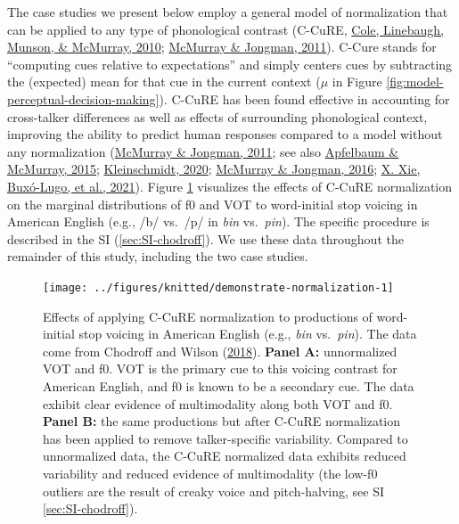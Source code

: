 \documentclass[
  11pt,
  man,floatsintext]{apa6}
\begin{document}
The case studies we present below employ a general model of normalization that can be applied to any type of phonological contrast (C-CuRE, \protect\hyperlink{ref-cole2010}{Cole, Linebaugh, Munson, \& McMurray, 2010}; \protect\hyperlink{ref-mcmurray-jongman2011}{McMurray \& Jongman, 2011}). C-Cure stands for ``computing cues relative to expectations'' and simply centers cues by subtracting the (expected) mean for that cue in the current context (\(\mu\) in Figure \ref{fig:model-perceptual-decision-making}). C-CuRE has been found effective in accounting for cross-talker differences as well as effects of surrounding phonological context, improving the ability to predict human responses compared to a model without any normalization (\protect\hyperlink{ref-mcmurray-jongman2011}{McMurray \& Jongman, 2011}; see also \protect\hyperlink{ref-apfelbaum-mcmurray2015}{Apfelbaum \& McMurray, 2015}; \protect\hyperlink{ref-kleinschmidt2020}{Kleinschmidt, 2020}; \protect\hyperlink{ref-mcmurray-jongman2016}{McMurray \& Jongman, 2016}; \protect\hyperlink{ref-xie2021cognition}{X. Xie, Buxó-Lugo, et al., 2021}).
Figure \ref{fig:demonstrate-normalization} visualizes the effects of C-CuRE normalization on the marginal distributions of f0 and VOT to word-initial stop voicing in American English (e.g., /b/ vs.~/p/ in \emph{bin} vs.~\emph{pin}). The specific procedure is described in the SI (\ref{sec:SI-chodroff}). We use these data throughout the remainder of this study, including the two case studies.



\begin{figure}

{\centering \texttt{[image: ../figures/knitted/demonstrate-normalization-1]} 

}

\caption{Effects of applying C-CuRE normalization to productions of word-initial stop voicing in American English (e.g., \emph{bin} vs.~\emph{pin}). The data come from Chodroff and Wilson (\protect\hyperlink{ref-chodroff-wilson2018}{2018}). \textbf{Panel A:} unnormalized VOT and f0. VOT is the primary cue to this voicing contrast for American English, and f0 is known to be a secondary cue. The data exhibit clear evidence of multimodality along both VOT and f0. \textbf{Panel B:} the same productions but after C-CuRE normalization has been applied to remove talker-specific variability. Compared to unnormalized data, the C-CuRE normalized data exhibits reduced variability and reduced evidence of multimodality (the low-f0 outliers are the result of creaky voice and pitch-halving, see SI \ref{sec:SI-chodroff}).}\label{fig:demonstrate-normalization}
\end{figure}
\end{document}
